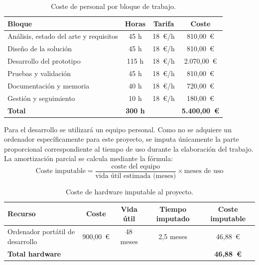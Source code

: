 \begin{table}[h!]
\centering
\small
\begin{tabular}{|p{5cm}|c|c|c|}
\hline
\textbf{Bloque} & \textbf{Horas} & \textbf{Tarifa} & \textbf{Coste} \\ \hline
Análisis, estado del arte y requisitos & 45 h  & 18~\euro/h & 810,00~\euro \\ \hline
Diseño de la solución                  & 45 h  & 18~\euro/h & 810,00~\euro \\ \hline
Desarrollo del prototipo               & 115 h & 18~\euro/h & 2.070,00~\euro \\ \hline
Pruebas y validación                   & 45 h  & 18~\euro/h & 810,00~\euro \\ \hline
Documentación y memoria                & 40 h  & 18~\euro/h & 720,00~\euro \\ \hline
Gestión y seguimiento                  & 10 h  & 18~\euro/h & 180,00~\euro \\ \hline
\textbf{Total}                         & \textbf{300 h} &  & \textbf{5.400,00~\euro} \\ \hline
\end{tabular}
\caption{Coste de personal por bloque de trabajo.}
\label{tab:coste-personal}
\end{table}

Para el desarrollo se utilizará un equipo personal. Como no se adquiere un ordenador específicamente para este proyecto, se imputa únicamente la parte proporcional correspondiente al tiempo de uso durante la elaboración del trabajo. La amortización parcial se calcula mediante la fórmula:
\[
\text{Coste imputable} = \frac{\text{coste del equipo}}{\text{vida útil estimada (meses)}} \times \text{meses de uso}
\]

\begin{table}[h!]
\centering
\small
\begin{tabular}{|p{4cm}|c|c|c|c|}
\hline
\textbf{Recurso} & \textbf{Coste} & \textbf{Vida útil} & \textbf{Tiempo imputado} & \textbf{Coste imputable} \\ \hline
Ordenador portátil de desarrollo & 900,00~\euro & 48 meses & 2,5 meses & 46,88~\euro \\ \hline
\textbf{Total hardware}          &              &          &           & \textbf{46,88~\euro} \\ \hline
\end{tabular}
\caption{Coste de hardware imputable al proyecto.}
\label{tab:coste-hardware}
\end{table}

